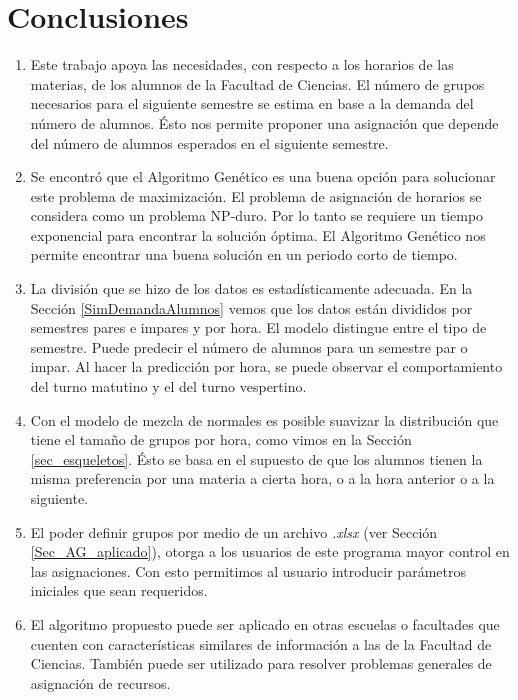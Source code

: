 \chapter{Conclusiones}

\begin{enumerate}
\item Este trabajo apoya las necesidades, con respecto a los horarios de las materias, de los alumnos de la Facultad de Ciencias. El número de grupos necesarios para el siguiente semestre se estima en base a la demanda del número de alumnos. Ésto nos permite proponer una asignación que depende del número de alumnos esperados en el siguiente semestre.

\item Se encontró que el Algoritmo Genético es una buena opción para solucionar este problema de maximización. El problema de asignación de horarios se considera como un problema NP-duro. Por lo tanto se requiere un tiempo exponencial para encontrar la solución óptima. El Algoritmo Genético nos permite encontrar una buena solución en un periodo corto de tiempo.%

\item La división que se hizo de los datos es estadísticamente adecuada. En la Sección \ref{SimDemandaAlumnos} vemos que los datos están divididos por semestres pares e impares y por hora. El modelo distingue entre el tipo de semestre. Puede predecir el número de alumnos para un semestre par o impar. Al hacer la predicción por hora, se puede observar el comportamiento del turno matutino y el del turno vespertino.

\item Con el modelo de mezcla de normales es posible suavizar la distribución que tiene el tamaño de grupos por hora, como vimos en la Sección \ref{sec_esqueletos}. Ésto se basa en el supuesto de que los alumnos tienen la misma preferencia por una materia a cierta hora, o a la hora anterior o a la siguiente. %

\item El poder definir grupos por medio de un archivo \textit{.xlsx} (ver Sección \ref{Sec_AG_aplicado}), otorga a los usuarios de este programa mayor control en las asignaciones. Con esto permitimos al usuario introducir parámetros iniciales que sean requeridos.

\item El algoritmo propuesto puede ser aplicado en otras escuelas o facultades que cuenten con características similares de información a las de la Facultad de Ciencias. También puede ser utilizado para resolver problemas generales de asignación de recursos.


\end{enumerate}
